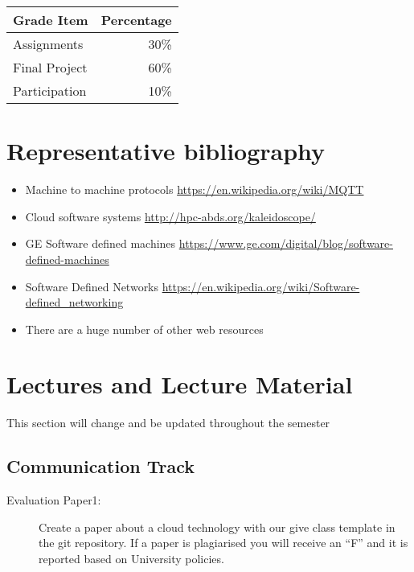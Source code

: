 \begin{tabular}{lr}
Grade Item	  & Percentage\\
\hline
Assignments	  & 30\% \\
Final Project	& 60\% \\
Participation	& 10\% \\
\hline
\end{tabular}



\section{Representative bibliography}

\begin{itemize}
\item	Machine to machine protocols \url{https://en.wikipedia.org/wiki/MQTT}
\item	Cloud software systems \url{http://hpc-abds.org/kaleidoscope/}
\item	GE Software defined machines \url{https://www.ge.com/digital/blog/software-defined-machines}
\item	Software Defined Networks \url{https://en.wikipedia.org/wiki/Software-defined_networking}
\item	There are a huge number of other web resources
\end{itemize}

\section{Lectures and Lecture Material}

\begin{WARNING}
This section will change and be updated throughout the semester
\end{WARNING}

\subsection{Communication Track}




\begin{description}
\item[Evaluation Paper1:] Create a paper about a cloud technology with
  our give class template in the git repository. If a paper is
  plagiarised you will receive an ``F'' and it is reported based on
  University policies.
\end{description}


